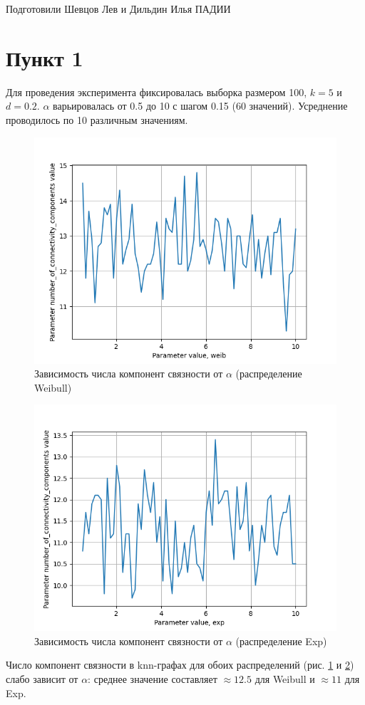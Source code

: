 \documentclass{HSEtitle}
\begin{document}
Подготовили Шевцов Лев и Дильдин Илья ПАДИИ

\section{Пункт 1}

Для проведения эксперимента фиксировалась выборка размером 100, $k=5$ и $d=0.2$. $\alpha$ варьировалась от 0.5 до 10 с шагом 0.15 (60 значений). Усреднение проводилось по 10 различным значениям.

\begin{figure}[H]
    \centering
    \includegraphics[width=0.7\linewidth]{weib_alpha_knn.png}
    \caption{Зависимость числа компонент связности от $\alpha$ (распределение Weibull)}
    \label{fig:weib_alpha_knn}
\end{figure}

\begin{figure}[H]
    \centering
    \includegraphics[width=0.7\linewidth]{exp_alpha_knn.png}
    \caption{Зависимость числа компонент связности от $\alpha$ (распределение Exp)}
    \label{fig:exp_alpha_knn}
\end{figure}

Число компонент связности в knn-графах для обоих распределений (рис. \ref{fig:weib_alpha_knn} и \ref{fig:exp_alpha_knn}) слабо зависит от $\alpha$: среднее значение составляет $\approx 12.5$ для Weibull и $\approx 11$ для Exp.
\end{document}
